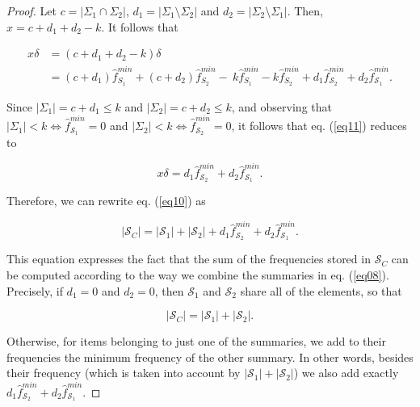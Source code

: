 \documentclass[final,3p,times]{elsarticle}
\newcommand\noi{\noindent}
\begin{document}
\begin{proof}
Let $c = \left\vert{\Sigma_1 \cap \Sigma_2}\right\vert$, $d_1 = \left\vert{\Sigma_1 \setminus \Sigma_2}\right\vert $ and  $d_2 = \left\vert{\Sigma_2 \setminus \Sigma_1}\right\vert$. Then, $x = c + d_1 + d_2 - k$. It follows that 

\begin{equation}
\label{eq11}
\begin{aligned}
x \delta&=(c + d_1 + d_2 - k) \delta \\
&=(c + d_1) \hat{f}_{S_1}^{min} + (c + d_2) \hat{f}_{S_2}^{min}  -  \ k \hat{f}_{S_1}^{min} - k \hat{f}_{S_2}^{min} + d_1 \hat{f}_{\mathcal{S}_2}^{min} + d_2 \hat{f}_{\mathcal{S}_1}^{min}.
\end{aligned}
\end{equation}

\noi Since $\left\vert{\Sigma_1}\right\vert = c + d_1 \leq k$ and $\left\vert{\Sigma_2}\right\vert = c + d_2 \leq k$, and observing that $\left\vert{\Sigma_1}\right\vert < k \Leftrightarrow \hat{f}_{\mathcal{S}_1}^{min} = 0$ and $\left\vert{\Sigma_2}\right\vert < k \Leftrightarrow \hat{f}_{\mathcal{S}_2}^{min} = 0$, it follows that eq. (\ref{eq11}) reduces to

\begin{equation}
\label{eq12}
x \delta = d_1 \hat{f}_{\mathcal{S}_2}^{min} + d_2 \hat{f}_{\mathcal{S}_1}^{min}.
\end{equation}

\noi Therefore, we can rewrite eq. (\ref{eq10}) as

\begin{equation}
\label{eq13}
\left\vert{\mathcal{S}_C}\right\vert = \left\vert{\mathcal{S}_1}\right\vert + \left\vert{\mathcal{S}_2}\right\vert +  d_1 \hat{f}_{\mathcal{S}_2}^{min} + d_2 \hat{f}_{\mathcal{S}_1}^{min}.
\end{equation}

\noi This equation expresses the fact that the sum of the frequencies stored in $\mathcal{S}_C$ can be computed according to the way we combine the summaries in eq. (\ref{eq08}). Precisely, if $d_1 = 0$ and $d_2 = 0$, then $\mathcal{S}_1$ and $\mathcal{S}_2$ share all of the elements, so that

\begin{equation}
\label{eq14}
\left\vert{\mathcal{S}_C}\right\vert = \left\vert{\mathcal{S}_1}\right\vert + \left\vert{\mathcal{S}_2}\right\vert.
\end{equation}

\noi Otherwise, for items belonging to just one of the summaries, we add to their frequencies the minimum frequency of the other summary. In other words, besides their frequency (which is taken into account by $\left\vert{\mathcal{S}_1}\right\vert + \left\vert{\mathcal{S}_2}\right\vert$) we also add exactly $d_1 \hat{f}_{\mathcal{S}_2}^{min} + d_2 \hat{f}_{\mathcal{S}_1}^{min}$.

\end{proof}
\end{document}

